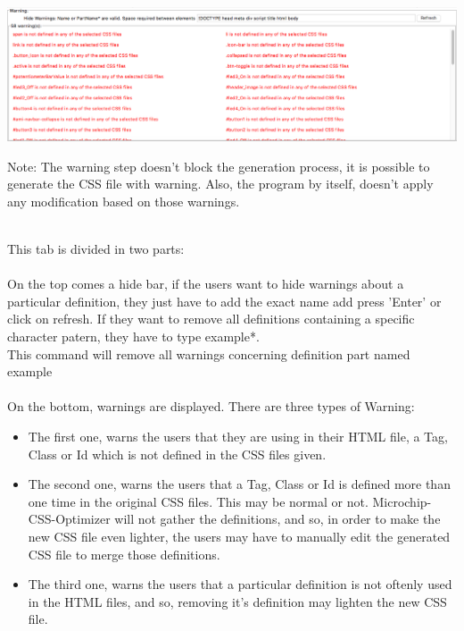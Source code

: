 \documentclass[10pt,letterpaper]{article}
\begin{document}
\begin{center} 
\includegraphics[scale=0.35]{stepwarning}
\end{center}
\begin{itshape}
Note: The warning step doesn't block the generation process, it is possible to generate the CSS file with warning. Also, the program by itself, doesn't apply any modification based on those warnings.\\
\end{itshape}
\\This tab is divided in two parts:\\
\\On the top comes a hide bar, if the users want to hide warnings about a particular definition, they just have to add the exact name add press 'Enter' or click on refresh. If they want to remove all definitions containing a specific character patern, they have to type example*.\\
This command will remove all warnings concerning definition part named example\\
\\On the bottom, warnings are displayed. There are three types of Warning:\\
\begin{itemize}
\item The first one, warns the users that they are using in their HTML file, a Tag, Class or Id which is not defined in the CSS files given.
\item The second one, warns the users that a Tag, Class or Id is defined more than one time in the original CSS files. This may be normal or not. Microchip-CSS-Optimizer will not gather the definitions, and so, in order to make the new CSS file even lighter, the users may have to manually edit the generated CSS file to merge those definitions.
\item The third one, warns the users that a particular definition is not oftenly used in the HTML files, and so, removing it's definition may lighten the new CSS file.
\end{itemize}
\newpage
\end{document}
